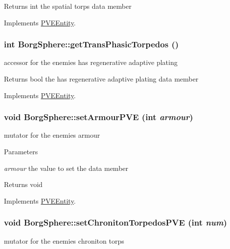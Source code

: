 \begin{DoxyReturn}{Returns}
int the spatial torps data member 
\end{DoxyReturn}


Implements \hyperlink{classPVEEntity}{PVEEntity}.

\hypertarget{classBorgSphere_a39fcff670b0233e6ee9eb8b25b723e36}{
\subsubsection[{getTransPhasicTorpedos}]{\setlength{\rightskip}{0pt plus 5cm}int BorgSphere::getTransPhasicTorpedos ()}}
\label{d6/ddd/classBorgSphere_a39fcff670b0233e6ee9eb8b25b723e36}
accessor for the enemies has regenerative adaptive plating

\begin{DoxyReturn}{Returns}
bool the has regenerative adaptive plating data member 
\end{DoxyReturn}


Implements \hyperlink{classPVEEntity}{PVEEntity}.

\hypertarget{classBorgSphere_a05cb3b566bae945876f16ba41720746e}{
\subsubsection[{setArmourPVE}]{\setlength{\rightskip}{0pt plus 5cm}void BorgSphere::setArmourPVE (int {\em armour})}}
\label{d6/ddd/classBorgSphere_a05cb3b566bae945876f16ba41720746e}
mutator for the enemies armour


\begin{DoxyParams}{Parameters}
\item[{\em armour}]the value to set the data member\end{DoxyParams}
\begin{DoxyReturn}{Returns}
void 
\end{DoxyReturn}


Implements \hyperlink{classPVEEntity}{PVEEntity}.

\hypertarget{classBorgSphere_a46e2416080d4e546645ae88c3a6c47d3}{
\subsubsection[{setChronitonTorpedosPVE}]{\setlength{\rightskip}{0pt plus 5cm}void BorgSphere::setChronitonTorpedosPVE (int {\em num})}}
\label{d6/ddd/classBorgSphere_a46e2416080d4e546645ae88c3a6c47d3}
mutator for the enemies chroniton torps


